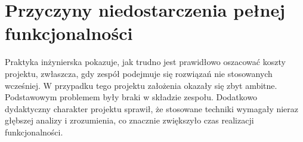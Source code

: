 \documentclass[12pt,a4paper]{article}
\begin{document}
\section{Przyczyny niedostarczenia pełnej funkcjonalności}
Praktyka inżynierska pokazuje, jak trudno jest prawidłowo oszacować koszty projektu, zwłaszcza, gdy zespół podejmuje się rozwiązań nie stosowanych wcześniej. W przypadku tego projektu założenia okazały się zbyt ambitne. Podstawowym problemem były
braki w składzie zespołu. Dodatkowo dydaktyczny charakter projektu sprawił,
że stosowane techniki wymagały nieraz głębszej analizy i zrozumienia, co
znacznie zwiększyło czas realizacji funkcjonalności.
\end{document}
